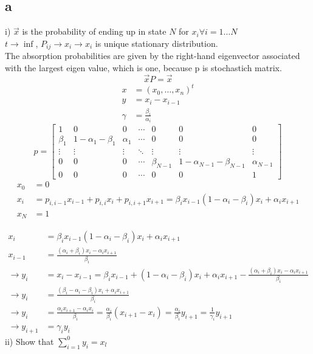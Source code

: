 \subsection{a}
i) $\vec{x}$ is the probability of ending up in state $N$ for $x_i \forall i=1 \dots N$\\
$t\rightarrow\inf$, $P_{ij} \rightarrow x_i \rightarrow x_i $ is unique stationary distribution. \\
The absorption probabilities are given by the right-hand eigenvector associated with the largest eigen value, which is one, because p is stochastich matrix.
\[ \vec{x}P = \vec{x} \]
\begin{align*}
x &= (x_0,\dots, x_n)^t\\
y &= x_i - x_{i-1}\\
\gamma &= \frac{\beta_{i}}{\alpha _{i}}
\end{align*}
\[p = \begin{bmatrix}
1 & 0 & 0 & \cdots & 0 & 0 & 0 \\
\beta _1 & 1-\alpha _1-\beta_1 & \alpha _1 & \cdots & 0 & 0 & 0 \\
\vdots &\vdots&\vdots&\ddots&\vdots&\vdots&\vdots\\
0 & 0 & 0 & \cdots & \beta_{N-1} & 1-\alpha_{N-1}-\beta_{N-1}&\alpha_{N-1}\\
0 & 0 & 0 & \cdots & 0 & 0 & 1 
\end{bmatrix}\]
\begin{align*}
x_0 &= 0\\
x_i &= p_{i,i-1}x_{i-1}+p_{i,i}x_i + p_{i,i+1}x_{i+1} = \beta_i x_{i-1}(1-\alpha_i - \beta_i)x_i + \alpha_i x_{i+1}\\
x_N &= 1
\end{align*}

\begin{align*}
x_i &= \beta_i x_{i-1}(1-\alpha_i - \beta_i)x_i + \alpha_i x_{i+1}\\
x_{i-1} &= \frac{(\alpha_i+\beta_i)x_i-\alpha_ix_{i+1}}{\beta_i}\\
\rightarrow y_i &= x_i - x_{i-1} = \beta_i x_{i-1} + (1-\alpha_i -\beta_i)x_i + \alpha_ix_{i+1}- \frac{(\alpha_i+\beta_i)x_i-\alpha_ix_{i+1}}{\beta_i}\\
\rightarrow y_i &= \frac{(\beta_i-\alpha_i -\beta_i)x_i+\alpha_ix_{i+1}}{\beta_i}\\
\rightarrow y_i &= \frac{\alpha_ix_{i+1} - \alpha_ix_{i}}{\beta_i} = \frac{\alpha_i}{\beta_i}(x_{i+1}-x_i) = \frac{\alpha_i}{\beta_i}y_{i+1} = \frac{1}{\gamma_i}y_{i+1}\\
\rightarrow y_{i+1} &= \gamma_iy_i
\end{align*}
ii) Show that $\sum\limits_{i=1}^{0}y_i = x_l$

